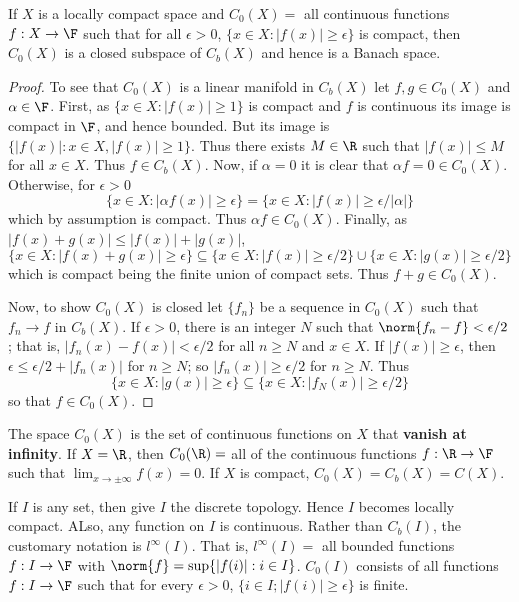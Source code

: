 \begin{prop}
    If $X$ is a locally compact space and $C_0(X) = $ all continuous functions $f:X\rightarrow \F$ such that for all $\epsilon > 0$, $\{x \in X:|f(x)| \geq \epsilon\}$ is compact, then $C_0(X)$ is a closed subspace of $C_b(X)$ and hence is a Banach space.
\end{prop}
\begin{proof}
    To see that $C_0(X)$ is a linear manifold in $C_b(X)$ let $f,g \in C_0(X)$ and $\alpha \in \F$. First, as $\{x \in X:|f(x)| \geq 1\}$ is compact and $f$ is continuous its image is compact in $\F$, and hence bounded. But its image is $\{|f(x)|: x \in X,|f(x)| \geq 1\}$. Thus there exists $M \in \R$ such that $|f(x)| \leq M$ for all $x \in X$. Thus $f \in C_b(X)$. Now, if $\alpha = 0$ it is clear that $\alpha f = 0 \in C_0(X)$. Otherwise, for $\epsilon > 0$ $$\{x \in X:|\alpha f(x)| \geq \epsilon\} = \{x \in X:|f(x)| \geq \epsilon/|\alpha|\}$$
    which by assumption is compact. Thus $\alpha f \in C_0(X)$. Finally, as $|f(x)+g(x)| \leq |f(x)|+|g(x)|$, $$\{x \in X:|f(x)+g(x)| \geq \epsilon\} \subseteq \{x \in X:|f(x)| \geq \epsilon/2\}\cup\{x \in X:|g(x)|\geq \epsilon/2\}$$
    which is compact being the finite union of compact sets. Thus $f+g \in C_0(X)$.

    Now, to show $C_0(X)$ is closed let $\{f_n\}$ be a sequence in $C_0(X)$ such that $f_n\rightarrow f$ in $C_b(X)$. If $\epsilon > 0$, there is an integer $N$ such that $\norm{f_n-f} < \epsilon/2$; that is, $|f_n(x) - f(x)| < \epsilon/2$ for all $n \geq N$ and $x \in X$. If $|f(x)| \geq \epsilon$, then $\epsilon \leq \epsilon/2 + |f_n(x)|$ for $n \geq N$; so $|f_n(x)| \geq \epsilon/2$ for $n \geq N$. Thus $$\{x \in X:|g(x)| \geq \epsilon\} \subseteq \{x \in X:|f_N(x)| \geq \epsilon/2\}$$
    so that $f \in C_0(X)$.
\end{proof}

The space $C_0(X)$ is the set of continuous functions on $X$ that \textbf{vanish at infinity}. If $X = \R$, then $C_0(\R) = $ all of the continuous functions $f:\R\rightarrow \F$ such that $\lim_{x\rightarrow \pm\infty}f(x) = 0$. If $X$ is compact, $C_0(X) = C_b(X) = C(X)$.

If $I$ is any set, then give $I$ the discrete topology. Hence $I$ becomes locally compact. ALso, any function on $I$ is continuous. Rather than $C_b(I)$, the customary notation is $l^{\infty}(I)$. That is, $l^{\infty}(I) = $ all bounded functions $f:I\rightarrow \F$ with $\norm{f} = \sup\{|f(i)|: i \in I\}$. $C_0(I)$ consists of all functions $f:I\rightarrow \F$ such that for every $\epsilon > 0$, $\{i \in I;|f(i)| \geq \epsilon\}$ is finite. 

